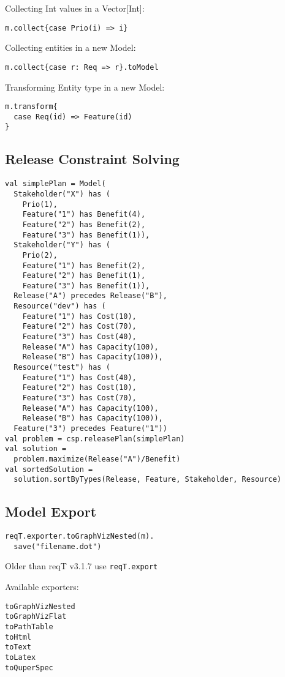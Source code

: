 \documentclass[9pt,a4paper,oneside]{report}
\begin{document}
\begin{multicols*}{4}
Collecting Int values in a Vector[Int]:
\begin{lstlisting}
m.collect{case Prio(i) => i}
\end{lstlisting}

Collecting entities in a new Model:
\begin{lstlisting}
m.collect{case r: Req => r}.toModel
\end{lstlisting}

Transforming Entity type in a new Model:
\begin{lstlisting}
m.transform{
  case Req(id) => Feature(id)
}
\end{lstlisting}

\subsection*{Release Constraint Solving}
\begin{lstlisting}[basicstyle=\ttfamily\scriptsize]
val simplePlan = Model(
  Stakeholder("X") has (
    Prio(1),
    Feature("1") has Benefit(4),
    Feature("2") has Benefit(2),
    Feature("3") has Benefit(1)),
  Stakeholder("Y") has (
    Prio(2),
    Feature("1") has Benefit(2),
    Feature("2") has Benefit(1),
    Feature("3") has Benefit(1)),
  Release("A") precedes Release("B"),  
  Resource("dev") has (
    Feature("1") has Cost(10),
    Feature("2") has Cost(70),
    Feature("3") has Cost(40),
    Release("A") has Capacity(100),
    Release("B") has Capacity(100)),
  Resource("test") has (
    Feature("1") has Cost(40),
    Feature("2") has Cost(10),
    Feature("3") has Cost(70),
    Release("A") has Capacity(100),
    Release("B") has Capacity(100)),
  Feature("3") precedes Feature("1"))
val problem = csp.releasePlan(simplePlan)
val solution = 
  problem.maximize(Release("A")/Benefit)
val sortedSolution = 
  solution.sortByTypes(Release, Feature, Stakeholder, Resource)
\end{lstlisting}

\subsection*{Model Export}
\begin{lstlisting}
reqT.exporter.toGraphVizNested(m).
  save("filename.dot")
\end{lstlisting}
{\small Older than reqT v3.1.7 use \lstinline{reqT.export}}

\vspace{0.5em}\noindent Available exporters:
\begin{lstlisting}
toGraphVizNested  
toGraphVizFlat  
toPathTable
toHtml
toText
toLatex
toQuperSpec
\end{lstlisting}
\end{multicols*}
\end{document}
